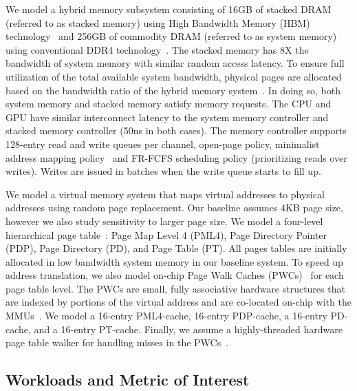 We model a hybrid memory subsystem consisting of 16GB of stacked DRAM
(referred to as stacked memory) using High Bandwidth Memory (HBM)
technology~\cite{hbm-spec} and 256GB of commodity DRAM (referred to as
system memory) using conventional DDR4 technology~\cite{ddr4-spec}.
The stacked memory has 8X the bandwidth of system memory with similar
random access latency. To ensure full utilization of the total
available system bandwidth, physical pages are allocated based on the
bandwidth ratio of the hybrid memory system~\cite{bwa,batman}. In
doing so, both system memory and stacked memory satisfy memory
requests. The CPU and GPU have similar interconnect latency to the
system memory controller and stacked memory controller (50ns in both
cases). The memory controller supports 128-entry read and write queues
per channel, open-page policy, minimalist address mapping
policy~\cite{minimalist} and FR-FCFS scheduling policy (prioritizing
reads over writes). Writes are issued in batches when the write queue
starts to fill up.


We model a virtual memory system that maps virtual addresses to
physical addresses using random page replacement. Our baseline assumes
4KB page size, however we also study sensitivity to larger page size.
We model a four-level hierarchical page table~\cite{SkipPT}: Page Map
Level 4 (PML4), Page Directory Pointer (PDP), Page Directory (PD), and
Page Table (PT). All pages tables are initially allocated in low
bandwidth system memory in our baseline system. To speed up address
translation, we also model on-chip Page Walk Caches
(PWCs)~\cite{SkipPT, MMUcaches} for each page table level. The PWCs
are small, fully associative hardware structures that are indexed by
portions of the virtual address and are co-located on-chip with the
MMUs~\cite{MMUcaches}. We model a 16-entry PML4-cache, 16-entry
PDP-cache, a 16-entry PD-cache, and a 16-entry
PT-cache\cite{MMUcaches}. Finally, we assume a highly-threaded
hardware page table walker for handling misses in the
PWCs~\cite{power2014supporting, pichaigpu}.

\subsection{Workloads and Metric of Interest}

